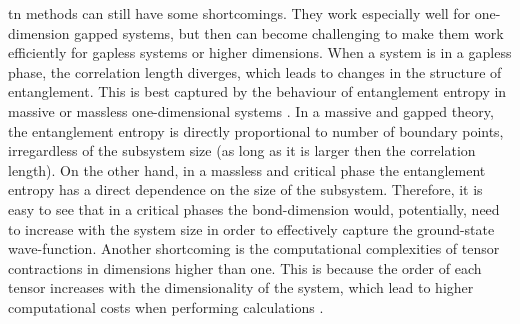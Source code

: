 \Ac{tn} methods can still have some shortcomings.
They work especially well for one-dimension gapped systems, but then can become challenging to make them work efficiently for gapless systems or higher dimensions.
When a system is in a gapless phase, the correlation length diverges, which leads to changes in the structure of entanglement.
This is best captured by the behaviour of entanglement entropy in massive or massless one-dimensional systems \cite{calabrese2004qft, calabrese2009cft}.
In a massive and gapped theory, the entanglement entropy is directly proportional to number of boundary points, irregardless of the subsystem size (as long as it is larger then the correlation length).
On the other hand, in a massless and critical phase the entanglement entropy has a direct dependence on the size of the subsystem.
Therefore, it is easy to see that in a critical phases the bond-dimension would, potentially, need to increase with the system size in order to effectively capture the ground-state wave-function.
Another shortcoming is the computational complexities of tensor contractions in dimensions higher than one.
This is because the order of each tensor increases with the dimensionality of the system, which lead to higher computational costs when performing calculations \cite{orus2014tensor}.
